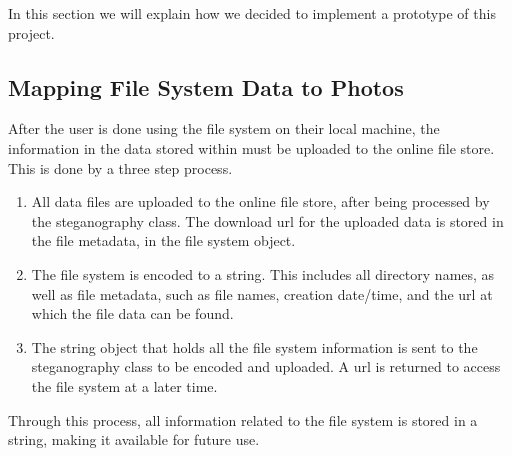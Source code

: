 \documentclass[12pt,journal,compsoc]{IEEEtran}
\begin{document}
In this section we will explain how we decided to implement a prototype of this project.





\subsection{Mapping File System Data to Photos}

After the user is done using the file system on their local machine, the information in the data stored within must be uploaded to the online file store. This is done by a three step process.
\begin{enumerate}
\item All data files are uploaded to the online file store, after being processed by the steganography class. The download url for the uploaded data is stored in the file metadata, in the file system object.
\item The file system is encoded to a string. This includes all directory names, as well as file metadata, such as file names, creation date/time, and the url at which the file data can be found.
\item The string object that holds all the file system information is sent to the steganography class to be encoded and uploaded. A url is returned to access the file system at a later time.
\end{enumerate}
Through this process, all information related to the file system is stored in a string, making it available for future use.





\end{document}
